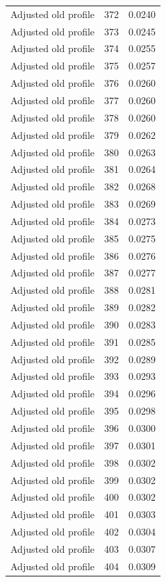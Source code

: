 \begin{table}[htbp]
\begin{tabular}{lll}
Adjusted old profile & 372 & 0.0240 \\
Adjusted old profile & 373 & 0.0245 \\
Adjusted old profile & 374 & 0.0255 \\
Adjusted old profile & 375 & 0.0257 \\
Adjusted old profile & 376 & 0.0260 \\
Adjusted old profile & 377 & 0.0260 \\
Adjusted old profile & 378 & 0.0260 \\
Adjusted old profile & 379 & 0.0262 \\
Adjusted old profile & 380 & 0.0263 \\
Adjusted old profile & 381 & 0.0264 \\
Adjusted old profile & 382 & 0.0268 \\
Adjusted old profile & 383 & 0.0269 \\
Adjusted old profile & 384 & 0.0273 \\
Adjusted old profile & 385 & 0.0275 \\
Adjusted old profile & 386 & 0.0276 \\
Adjusted old profile & 387 & 0.0277 \\
Adjusted old profile & 388 & 0.0281 \\
Adjusted old profile & 389 & 0.0282 \\
Adjusted old profile & 390 & 0.0283 \\
Adjusted old profile & 391 & 0.0285 \\
Adjusted old profile & 392 & 0.0289 \\
Adjusted old profile & 393 & 0.0293 \\
Adjusted old profile & 394 & 0.0296 \\
Adjusted old profile & 395 & 0.0298 \\
Adjusted old profile & 396 & 0.0300 \\
Adjusted old profile & 397 & 0.0301 \\
Adjusted old profile & 398 & 0.0302 \\
Adjusted old profile & 399 & 0.0302 \\
Adjusted old profile & 400 & 0.0302 \\
Adjusted old profile & 401 & 0.0303 \\
Adjusted old profile & 402 & 0.0304 \\
Adjusted old profile & 403 & 0.0307 \\
Adjusted old profile & 404 & 0.0309 \\

\end{tabular}
\end{table}
